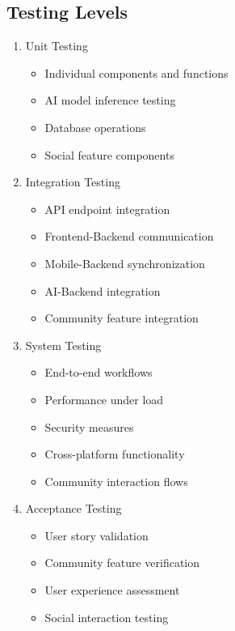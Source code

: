 \subsection{Testing Levels}
\begin{enumerate}
    \item Unit Testing
    \begin{itemize}
        \item Individual components and functions
        \item AI model inference testing
        \item Database operations
        \item Social feature components
    \end{itemize}
    
    \item Integration Testing
    \begin{itemize}
        \item API endpoint integration
        \item Frontend-Backend communication
        \item Mobile-Backend synchronization
        \item AI-Backend integration
        \item Community feature integration
    \end{itemize}
    
    \item System Testing
    \begin{itemize}
        \item End-to-end workflows
        \item Performance under load
        \item Security measures
        \item Cross-platform functionality
        \item Community interaction flows
    \end{itemize}
    
    \item Acceptance Testing
    \begin{itemize}
        \item User story validation
        \item Community feature verification
        \item User experience assessment
        \item Social interaction testing
    \end{itemize}
\end{enumerate}

